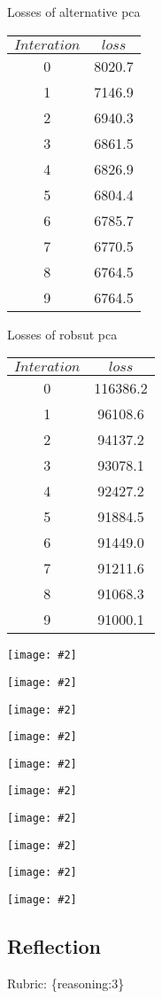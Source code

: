 \documentclass{article}
\def\rubric#1{\gre{Rubric: \{#1\}}}{}
\def\gre#1{{\color{gre}#1}}
\def\ans#1{{\color{ans}#1}}
\newcommand{\centerfig}[2]{\begin{center}\texttt{[image: \#2]}\end{center}}
\begin{document}
\ans{
    Losses of alternative pca
    \begin{center}
    \begin{tabular}{cc}
    $Interation$ & $loss$\\
    \hline
    0 &  8020.7 \\
    1 &  7146.9 \\
    2 &  6940.3 \\
    3 &  6861.5 \\
    4 &  6826.9 \\
    5 &  6804.4 \\
    6 &  6785.7 \\
    7 &  6770.5 \\
    8 &  6764.5 \\
    9 &  6764.5 \\
    \end{tabular}
    \end{center}
    Losses of robsut pca
    \begin{center}
    \begin{tabular}{cc}
    $Interation$ & $loss$\\
    \hline
    0 & 116386.2 \\
    1 & 96108.6 \\
    2 & 94137.2 \\
    3 & 93078.1 \\
    4 & 92427.2 \\
    5 & 91884.5 \\
    6 & 91449.0 \\
    7 & 91211.6 \\
    8 & 91068.3 \\
    9 & 91000.1 \\
    \end{tabular}
    \end{center}
    \centerfig{0.5}{../figs/highway_000.png}
    \centerfig{0.5}{../figs/highway_001.png}
    \centerfig{0.5}{../figs/highway_002.png}
    \centerfig{0.5}{../figs/highway_003.png}
    \centerfig{0.5}{../figs/highway_004.png}
    \centerfig{0.5}{../figs/highway_005.png}
    \centerfig{0.5}{../figs/highway_006.png}
    \centerfig{0.5}{../figs/highway_007.png}
    \centerfig{0.5}{../figs/highway_008.png}
    \centerfig{0.5}{../figs/highway_009.png}
}

\subsection{Reflection}
\rubric{reasoning:3}
\end{document}
